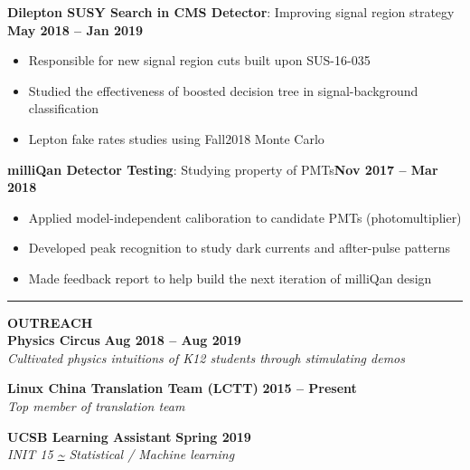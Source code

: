 \documentclass[12pt]{article}
\begin{document}
\textbf{Dilepton SUSY Search in CMS Detector}: Improving signal region strategy \hfill \textbf{May 2018 -- Jan 2019}
\begin{itemize}
    \item Responsible for new signal region cuts built upon SUS-16-035
    \item Studied the effectiveness of boosted decision tree in signal-background classification
    \item Lepton fake rates studies using Fall2018 Monte Carlo
\end{itemize}
\textbf{milliQan Detector Testing}: Studying property of PMTs\hfill \textbf{Nov 2017 -- Mar 2018}
\begin{itemize}
    \item Applied model-independent caliboration to candidate PMTs (photomultiplier) 
    \item Developed peak recognition to study dark currents and aflter-pulse patterns
    \item Made feedback report to help build the next iteration of milliQan design
\end{itemize}
\noindent\rule{\textwidth}{1pt}
\smallskip
\textbf{\large OUTREACH} \\
\textbf{Physics Circus} \hfill \textbf{Aug 2018 -- Aug 2019}\\
\textsl{Cultivated physics intuitions of K12 students through stimulating demos}

\textbf{Linux China Translation Team (LCTT)} \hfill \textbf{2015 -- Present} \\
\textsl{Top member of translation team}

\textbf{UCSB Learning Assistant} \hfill \textbf{Spring 2019}\\
\textsl{INIT 15 \url{~} Statistical / Machine learning}
\end{document}
